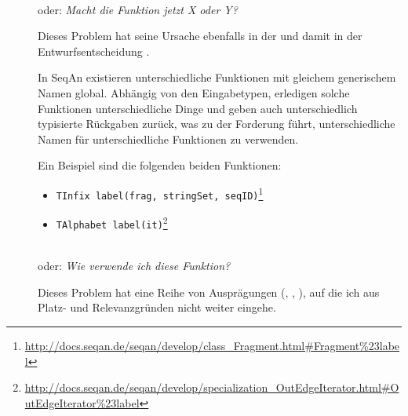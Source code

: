 \begin{itemize}
\begin{description}
\begin{description}
      \item[] \textbf{} \\
      oder: \textit{Macht die Funktion jetzt X oder Y?}
      
      Dieses Problem hat seine Ursache ebenfalls in der  und damit in der Entwurfsentscheidung .
      
      In SeqAn existieren unterschiedliche Funktionen mit gleichem generischem Namen global. Abhängig von den Eingabetypen, erledigen solche Funktionen unterschiedliche Dinge und geben auch unterschiedlich typisierte Rückgaben zurück, was zu der Forderung führt, unterschiedliche Namen für unterschiedliche Funktionen zu verwenden.
      
      Ein Beispiel sind die folgenden beiden Funktionen:
      \begin{itemize}
        \item \texttt{TInfix label(frag, stringSet, seqID)}\footnote{\url{http://docs.seqan.de/seqan/develop/class\_Fragment.html\#Fragment\%23label}}
        \item \texttt{TAlphabet label(it)}\footnote{\url{http://docs.seqan.de/seqan/develop/specialization\_OutEdgeIterator.html\#OutEdgeIterator\%23label}}
      \end{itemize}

      \item[] \textbf{} \\
      oder: \textit{Wie verwende ich diese Funktion?}
      
      Dieses Problem hat eine Reihe von Ausprägungen (, , ), auf die ich aus Platz- und Relevanzgründen nicht weiter eingehe.
      

\end{description}
\end{description}
\end{itemize}
